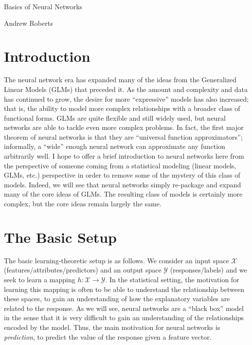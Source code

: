 \documentclass[12pt]{article}
\begin{document}
\begin{center}
\Large
Basics of Neural Networks 
\end{center}

\begin{flushright}
Andrew Roberts
\end{flushright} 

\section{Introduction}
The neural network era has expanded many of the ideas from the Generalized Linear Models (GLMs) that preceded it. As the amount and complexity and data has continued 
to grow, the desire for more ``expressive'' models has also increased; that is, the ability to model more complex relationships with a broader class of functional forms. GLMs are 
quite flexible and still widely used, but neural networks are able to tackle even more complex problems. In fact, the first major theorem of neural networks is that they are 
``universal function approximators''; informally, a ``wide'' enough neural network can approximate any function arbitrarily well. I hope to offer a brief introduction to neural 
networks here from the perspective of someone coming from a statistical modeling (linear models, GLMs, etc.) perspective in order to remove some of the mystery of this class 
of models. Indeed, we will see that neural networks simply re-package and expand many of the core ideas of GLMs. The resulting class of models is certainly more complex, but the 
core ideas remain largely the same. 

\section{The Basic Setup}
The basic learning-theoretic setup is as follows. We consider an input space $\mathcal{X}$ (features/attributes/predictors) and an output space $\mathcal{Y}$ (responses/labels)
and we seek to learn a mapping $h: \mathcal{X} \to \mathcal{Y}$. In the statistical setting, the motivation for learning this mapping is often to be able to understand the relationship
between these spaces, to gain an understanding of how the explanatory variables are related to the response. As we will see, neural networks are a ``black box'' model in the sense 
that it is very difficult to gain an understanding of the relationships encoded by the model. Thus, the main motivation for neural networks is \textit{prediction}, to predict the value of the 
response given a feature vector. 
\end{document}
